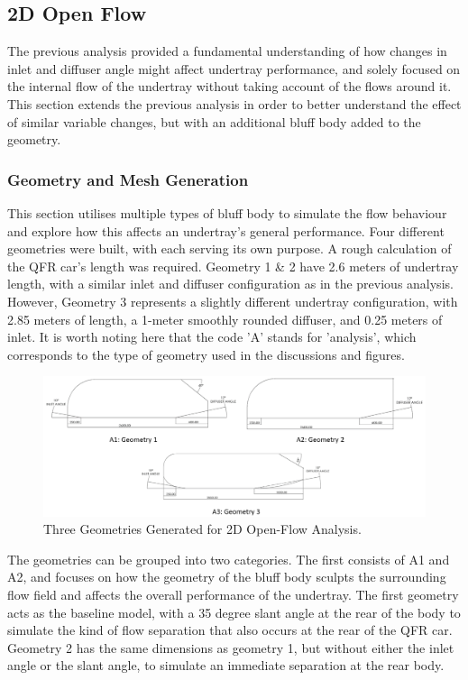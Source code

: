 

\subsection{2D Open Flow}
The previous analysis provided a fundamental understanding of how changes in inlet and diffuser angle might affect undertray performance, and solely focused on the internal flow of the undertray without taking account of the flows around it. This section extends the previous analysis in order to better understand the effect of similar variable changes, but with an additional bluff body added to the geometry. 

\subsubsection{Geometry and Mesh Generation}
This section utilises multiple types of bluff body to simulate the flow behaviour and explore how this affects an undertray's general performance. Four different geometries were built, with each serving its own purpose. A rough calculation of the QFR car's length was required. Geometry 1 \& 2 have 2.6 meters of undertray length, with a similar inlet and diffuser configuration as in the previous analysis. However, Geometry 3 represents a slightly different undertray configuration, with 2.85 meters of length, a 1-meter smoothly rounded diffuser, and 0.25 meters of inlet. It is worth noting here that the code 'A' stands for 'analysis', which corresponds to the type of geometry used in the discussions and figures.

\begin{figure}[!ht]
    \centering
    \includegraphics[scale = 0.5]{Figures/2D_OF/2D_OF_GEOM.png}
    \caption{Three Geometries Generated for 2D Open-Flow Analysis.}
    \label{fig:2D_OF_GEOM}
\end{figure}

\noindent The geometries can be grouped into two categories. The first consists of A1 and A2, and focuses on how the geometry of the bluff body sculpts the surrounding flow field and affects the overall performance of the undertray. The first geometry acts as the baseline model, with a 35 degree slant angle at the rear of the body to simulate the kind of flow separation that also occurs at the rear of the QFR car. Geometry 2 has the same dimensions as geometry 1, but without either the inlet angle or the slant angle, to simulate an immediate separation at the rear body.

